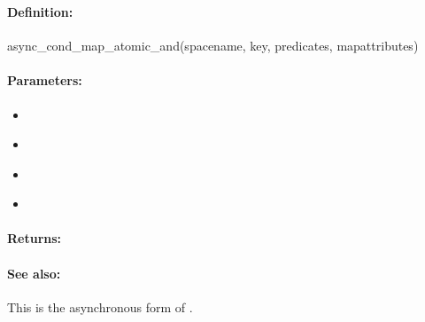 \pagebreak
\subsubsection{}
\label{api:ruby:async_cond_map_atomic_and}


\paragraph{Definition:}
\begin{rubycode}
async_cond_map_atomic_and(spacename, key, predicates, mapattributes)
\end{rubycode}

\paragraph{Parameters:}
\begin{itemize}[noitemsep]
\item {}\\

\item {}\\

\item {}\\

\item {}\\

\end{itemize}

\paragraph{Returns:}


\paragraph{See also:}  This is the asynchronous form of .

\pagebreak
\subsubsection{}
\label{api:ruby:group_map_atomic_and}


